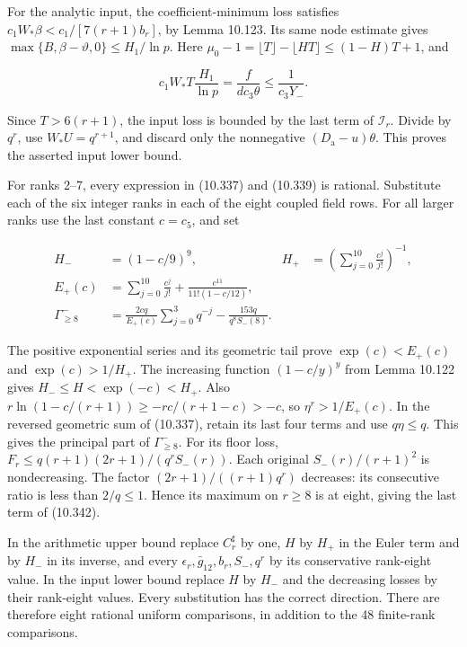 \documentclass[
  11pt,
  a4paper,
]{article}
\begin{document}
For the analytic input, the coefficient-minimum loss satisfies
\(c_1W_*\beta<c_1/[7(r+1)b_r]\), by Lemma 10.123. Its same node estimate
gives \(\max\{B,\beta-\vartheta,0\}\le H_1/\ln p\). Here
\(\mu_0-1=\lfloor T\rfloor-\lfloor HT\rfloor\le(1-H)T+1\), and

\[
c_1W_*T\frac{H_1}{\ln p}
=\frac f{dc_3\theta}\le\frac1{c_3Y_-}.
\]

Since \(T>6(r+1)\), the input loss is bounded by the last term of
\(\mathcal I_r\). Divide by \(q^r\), use \(W_*U=q^{r+1}\), and discard
only the nonnegative \((D_{\mathrm a}-u)\theta\). This proves the
asserted input lower bound.

For ranks 2--7, every expression in (10.337) and (10.339) is rational.
Substitute each of the six integer ranks in each of the eight coupled
field rows. For all larger ranks use the last constant \(c=c_5\), and
set

\[
\begin{aligned}
H_-&=(1-c/9)^9,&
H_+&=\left(\sum_{j=0}^{10}\frac{c^j}{j!}\right)^{-1},\\
E_+(c)&=\sum_{j=0}^{10}\frac{c^j}{j!}
 +\frac{c^{11}}{11!(1-c/12)},\\
\Gamma_{\ge8}^{-}&=
\frac{2cq}{E_+(c)}\sum_{j=0}^{3}q^{-j}
 -\frac{153q}{q^8S_-(8)}.
\end{aligned}
\tag{10.342}
\]

The positive exponential series and its geometric tail prove
\(\exp(c)<E_+(c)\) and \(\exp(c)>1/H_+\). The increasing function
\((1-c/y)^y\) from Lemma 10.122 gives \(H_-\le H<\exp(-c)<H_+\). Also
\(r\ln(1-c/(r+1))\ge-rc/(r+1-c)>-c\), so \(\eta^r>1/E_+(c)\). In the
reversed geometric sum of (10.337), retain its last four terms and use
\(q\eta\le q\). This gives the principal part of \(\Gamma_{\ge8}^{-}\).
For its floor loss, \(F_r\le q(r+1)(2r+1)/(q^rS_-(r))\). Each original
\(S_-(r)/(r+1)^2\) is nondecreasing. The factor \((2r+1)/((r+1)q^r)\)
decreases: its consecutive ratio is less than \(2/q\le1\). Hence its
maximum on \(r\ge8\) is at eight, giving the last term of (10.342).

In the arithmetic upper bound replace \(C_r^{\sharp}\) by one, \(H\) by
\(H_+\) in the Euler term and by \(H_-\) in its inverse, and every
\(\epsilon_r,\bar g_{12},b_r,S_-,q^r\) by its conservative rank-eight
value. In the input lower bound replace \(H\) by \(H_-\) and the
decreasing losses by their rank-eight values. Every substitution has the
correct direction. There are therefore eight rational uniform
comparisons, in addition to the 48 finite-rank comparisons.
\end{document}
